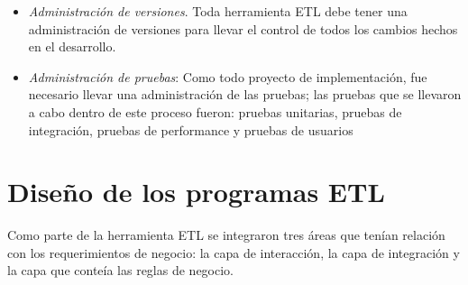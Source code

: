 \documentclass[a4paper,openright,12pt]{book}
\begin{document}
\begin{itemize}
\item \textit{Administración de versiones}. Toda herramienta ETL debe tener una
  administración de versiones para llevar el control de todos los cambios hechos
  en el desarrollo.

\item \textit{Administración de pruebas}: Como todo proyecto de implementación,
  fue necesario llevar una administración de las pruebas; las pruebas que se
  llevaron a cabo dentro de este proceso fueron: pruebas unitarias, pruebas de
  integración, pruebas de performance y pruebas de usuarios

\end{itemize}

\section{Diseño de los programas ETL}

Como parte de la herramienta ETL se integraron tres áreas que tenían relación
con los requerimientos de negocio: la capa de interacción, la capa de
integración y la capa que conteía las reglas de negocio.
\end{document}
